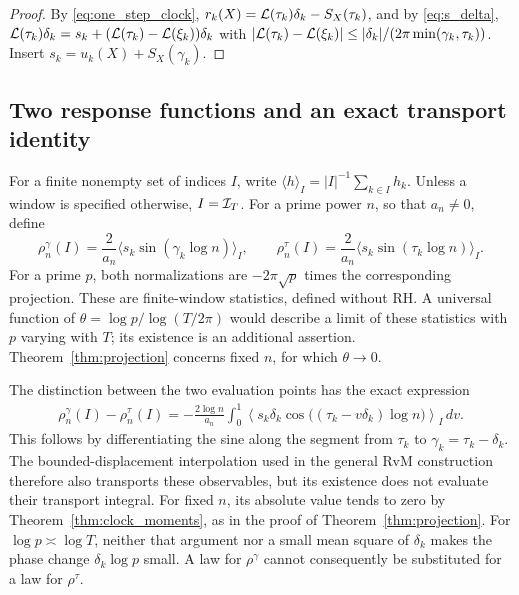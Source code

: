 \documentclass[11pt,reqno]{amsart}
\theoremstyle{plain}\newtheorem{theorem}{Theorem}[section]\newtheorem{proposition}[theorem]{Proposition}\newtheorem{lemma}[theorem]{Lemma}\newtheorem{corollary}[theorem]{Corollary}
\theoremstyle{definition}\newtheorem{hypothesis}[theorem]{Hypothesis}\newtheorem{definition}[theorem]{Definition}
\theoremstyle{remark}\newtheorem{remark}[theorem]{Remark}\newtheorem{experiment}[theorem]{Experiment}\newtheorem{question}[theorem]{Question}\newtheorem{heuristic}[theorem]{Heuristic}\newtheorem{conjecture}[theorem]{Conjecture}
\begin{document}
\begin{proof}
By \eqref{eq:one_step_clock}, $r_k(X)=\mathcal L(\tau_k)\delta_k-S_X(\tau_k)$, and by \eqref{eq:s_delta}, $\mathcal L(\tau_k)\delta_k=s_k+(\mathcal L(\tau_k)-\mathcal L(\xi_k))\delta_k$ with $|\mathcal L(\tau_k)-\mathcal L(\xi_k)|\le|\delta_k|/(2\pi\min(\gamma_k,\tau_k))$. Insert $s_k=u_k(X)+S_X(\gamma_k)$.
\end{proof}

\subsection{Two response functions and an exact transport identity}
\label{subsec:two_responses}
For a finite nonempty set of indices $I$, write $\langle h\rangle_I=|I|^{-1}\sum_{k\in I}h_k$. Unless a window is specified otherwise, $I=\mathcal I_T$. For a prime power $n$, so that $a_n\ne0$, define
\begin{equation}
 \rho_n^\gamma(I)=\frac{2}{a_n}\langle s_k\sin(\gamma_k\log n)\rangle_I,
 \qquad
 \rho_n^\tau(I)=\frac{2}{a_n}\langle s_k\sin(\tau_k\log n)\rangle_I.
 \label{eq:two_responses}
\end{equation}
For a prime $p$, both normalizations are $-2\pi\sqrt p$ times the corresponding projection. These are finite-window statistics, defined without RH. A universal function of $\theta=\log p/\log(T/2\pi)$ would describe a limit of these statistics with $p$ varying with $T$; its existence is an additional assertion. Theorem~\ref{thm:projection} concerns fixed $n$, for which $\theta\to0$.

The distinction between the two evaluation points has the exact expression
\begin{equation}
 \begin{split}
 \rho_n^\gamma(I)-\rho_n^\tau(I)
 =-\frac{2\log n}{a_n}\int_0^1
 \left\langle s_k\delta_k
 \cos\bigl((\tau_k-v\delta_k)\log n\bigr)\right\rangle_I\,dv .
 \end{split}
 \label{eq:response_transport}
\end{equation}
This follows by differentiating the sine along the segment from $\tau_k$ to $\gamma_k=\tau_k-\delta_k$. The bounded-displacement interpolation used in the general RvM construction therefore also transports these observables, but its existence does not evaluate their transport integral. For fixed $n$, its absolute value tends to zero by Theorem~\ref{thm:clock_moments}, as in the proof of Theorem~\ref{thm:projection}. For $\log p\asymp\log T$, neither that argument nor a small mean square of $\delta_k$ makes the phase change $\delta_k\log p$ small. A law for $\rho^\gamma$ cannot consequently be substituted for a law for $\rho^\tau$.
\end{document}

